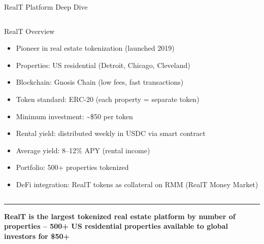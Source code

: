 \documentclass[8pt,aspectratio=169]{beamer}
\newcommand{\bottomnote}[1]{\vfill\vspace{-2mm}\textcolor{mllavender2}{\rule{\textwidth}{0.4pt}}\vspace{1mm}\footnotesize\textbf{#1}}
\begin{document}
\begin{frame}{RealT Platform Deep Dive}
\begin{columns}[T]
\vspace{2mm}
\footnotesize
\begin{block}{RealT Overview}
\begin{itemize}
  \item Pioneer in real estate tokenization (launched 2019)
  \item Properties: US residential (Detroit, Chicago, Cleveland)
  \item Blockchain: Gnosis Chain (low fees, fast transactions)
  \item Token standard: ERC-20 (each property = separate token)
  \item Minimum investment: \textasciitilde\$50 per token
  \item Rental yield: distributed weekly in USDC via smart contract
  \item Average yield: 8--12\% APY (rental income)
  \item Portfolio: 500+ properties tokenized
  \item DeFi integration: RealT tokens as collateral on RMM (RealT Money Market)
\end{itemize}
\end{block}

\vspace{2mm}
\end{columns}
\bottomnote{RealT is the largest tokenized real estate platform by number of properties -- 500+ US residential properties available to global investors for \$50+}
\end{frame}
\end{document}
